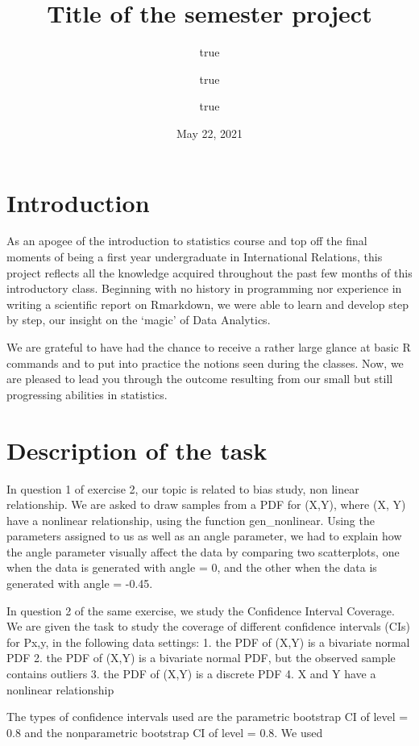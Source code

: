 \documentclass[11pt,]{article}
\title{Title of the semester project}
\author{true \and true \and true}
\date{May 22, 2021}
\begin{document}
\maketitle

\hypertarget{introduction}{%
\section{Introduction}\label{introduction}}

As an apogee of the introduction to statistics course and top off the
final moments of being a first year undergraduate in International
Relations, this project reflects all the knowledge acquired throughout
the past few months of this introductory class. Beginning with no
history in programming nor experience in writing a scientific report on
Rmarkdown, we were able to learn and develop step by step, our insight
on the `magic' of Data Analytics.

We are grateful to have had the chance to receive a rather large glance
at basic R commands and to put into practice the notions seen during the
classes. Now, we are pleased to lead you through the outcome resulting
from our small but still progressing abilities in statistics.

\hypertarget{description-of-the-task}{%
\section{Description of the task}\label{description-of-the-task}}

In question 1 of exercise 2, our topic is related to bias study, non
linear relationship. We are asked to draw samples from a PDF for (X,Y),
where (X, Y) have a nonlinear relationship, using the function
gen\_nonlinear. Using the parameters assigned to us as well as an angle
parameter, we had to explain how the angle parameter visually affect the
data by comparing two scatterplots, one when the data is generated with
angle = 0, and the other when the data is generated with angle = -0.45.

In question 2 of the same exercise, we study the Confidence Interval
Coverage. We are given the task to study the coverage of different
confidence intervals (CIs) for Px,y, in the following data settings: 1.
the PDF of (X,Y) is a bivariate normal PDF 2. the PDF of (X,Y) is a
bivariate normal PDF, but the observed sample contains outliers 3. the
PDF of (X,Y) is a discrete PDF 4. X and Y have a nonlinear relationship

The types of confidence intervals used are the parametric bootstrap CI
of level = 0.8 and the nonparametric bootstrap CI of level = 0.8. We
used
\end{document}
